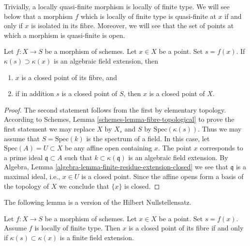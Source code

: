 \noindent
Trivially, a locally quasi-finite morphism is locally of finite type.
We will see below that a morphism $f$ which is locally of finite type
is quasi-finite at $x$ if and only if $x$ is isolated in its fibre.
Moreover, we will see that the set of points at which a morphism
is quasi-finite is open.

\begin{lemma}
\label{lemma-algebraic-residue-field-extension-closed-point-fibre}
Let $f : X \to S$ be a morphism of schemes.
Let $x \in X$ be a point. Set $s = f(x)$.
If $\kappa(s) \supset \kappa(x)$
is an algebraic field extension, then
\begin{enumerate}
\item $x$ is a closed point of its fibre, and
\item if in addition $s$ is a closed point of $S$, then
$x$ is a closed point of $X$.
\end{enumerate}
\end{lemma}

\begin{proof}
The second statement follows from the first by elementary topology.
According to Schemes, Lemma \ref{schemes-lemma-fibre-topological}
to prove the first statement
we may replace $X$ by $X_s$ and $S$ by $\text{Spec}(\kappa(s))$.
Thus we may assume that $S = \text{Spec}(k)$ is the spectrum of a field.
In this case, let $\text{Spec}(A) = U \subset X$ be any affine open
containing $x$. The point $x$ corresponds to a prime ideal
$\mathfrak q \subset A$ such that $k \subset \kappa(\mathfrak q)$
is an algebraic field extension. By
Algebra, Lemma \ref{algebra-lemma-finite-residue-extension-closed}
we see that $\mathfrak q$ is a maximal ideal, i.e., $x \in U$ is a
closed point. Since the affine opens form
a basis of the topology of $X$ we conclude that $\{x\}$ is closed.
\end{proof}

\noindent
The following lemma is a version of the Hilbert Nullstellensatz.

\begin{lemma}
\label{lemma-closed-point-fibre-locally-finite-type}
Let $f : X \to S$ be a morphism of schemes.
Let $x \in X$ be a point. Set $s = f(x)$.
Assume $f$ is locally of finite type.
Then $x$ is a closed point of its fibre
if and only if $\kappa(s) \subset \kappa(x)$ is
a finite field extension.
\end{lemma}

